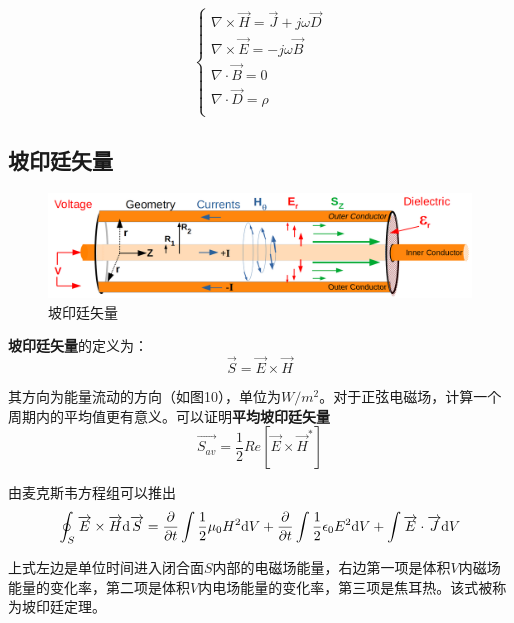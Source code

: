 \documentclass[UTF8,a4paper,11pt]{article}
\begin{document}
\begin{equation}
\begin{cases}
\nabla\times\overrightarrow{H}=\overrightarrow{J}+j\omega\overrightarrow{D}\\
\nabla\times\overrightarrow{E}=-j\omega\overrightarrow{B}\\
\nabla\cdot\overrightarrow{B}=0\\
\nabla\cdot\overrightarrow{D}=\rho\\
\end{cases}
\end{equation}

\subsection{坡印廷矢量}
\begin{figure}[htbp]
\centering
\includegraphics[scale=0.15]{p10.png}
\caption{坡印廷矢量}
\end{figure}

\textbf{坡印廷矢量}的定义为：
\begin{equation}
\overrightarrow{S}=\overrightarrow{E}\times\overrightarrow{H}
\end{equation}

其方向为能量流动的方向（如图10），单位为$W/m^2$。对于正弦电磁场，计算一个周期内的平均值更有意义。可以证明\textbf{平均坡印廷矢量}
\begin{equation}
\overrightarrow{S_{av}}=\frac{1}{2}Re[\overrightarrow{E}\times\overrightarrow{H}^*]
\end{equation}

由麦克斯韦方程组可以推出
\begin{equation}
\oint_S\overrightarrow{E}\times\overrightarrow{H}{\rm d}\overrightarrow{S}=\frac{\partial}{\partial t}\int\frac{1}{2}\mu_0H^2{\rm d}V+\frac{\partial}{\partial t}\int\frac{1}{2}\epsilon_0E^2{\rm d}V+\int\overrightarrow{E}\cdot\overrightarrow{J}{\rm d}V
\end{equation}

上式左边是单位时间进入闭合面$S$内部的电磁场能量，右边第一项是体积$V$内磁场能量的变化率，第二项是体积$V$内电场能量的变化率，第三项是焦耳热。该式被称为坡印廷定理。
\end{document}
